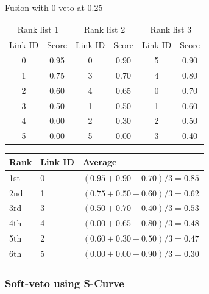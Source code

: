 \begin{example}
  \centering
  \caption{Fusion with $0$-veto at 0.25}
  \label{ex:veto_0}

  \begin{subexample}{\linewidth}
    \centering
    \begin{tabular}{c c|c c|c c}
      \toprule
      \multicolumn{2}{c}{Rank list 1} &
      \multicolumn{2}{c}{Rank list 2} &
      \multicolumn{2}{c}{Rank list 3} \\
      Link ID & Score &
      Link ID & Score &
      Link ID & Score \\
      \midrule
      0 & 0.95 & 0 & 0.90 & 5 & 0.90 \\
      1 & 0.75 & 3 & 0.70 & 4 & 0.80 \\
      2 & 0.60 & 4 & 0.65 & 0 & 0.70 \\
      3 & 0.50 & 1 & 0.50 & 1 & 0.60 \\
      4 & 0.00 & 2 & 0.30 & 2 & 0.50 \\
      5 & 0.00 & 5 & 0.00 & 3 & 0.40 \\
      \bottomrule
    \end{tabular}
  \end{subexample}

  \vspace{0.5cm}

  \begin{subexample}{\linewidth}
    \centering
    \begin{tabular}{l l l}
      \toprule
      Rank & Link ID & Average \\
      \midrule
      1st & 0 & $(0.95 + 0.90 + 0.70)/3 = 0.85$ \\
      2nd & 1 & $(0.75 + 0.50 + 0.60)/3 = 0.62$ \\
      3rd & 3 & $(0.50 + 0.70 + 0.40)/3 = 0.53$ \\
      4th & 4 & $(0.00 + 0.65 + 0.80)/3 = 0.48$ \\
      5th & 2 & $(0.60 + 0.30 + 0.50)/3 = 0.47$ \\
      6th & 5 & $(0.00 + 0.00 + 0.90)/3 = 0.30$ \\
      \bottomrule
    \end{tabular}
  \end{subexample}
\end{example}

\subsubsection{Soft-veto using S-Curve}

